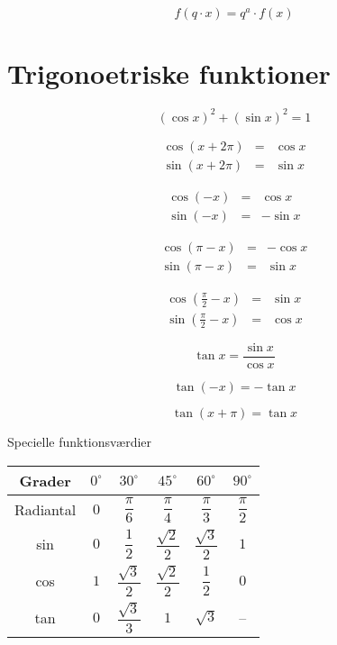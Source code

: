 \documentclass[11pt,a4paper,landscape,twocolumn,fleqn,leqno]{article}
\begin{document}
\begin{equation}
f(q \cdot x) = q^a \cdot f(x)
\end{equation}

\vfill

\section{Trigonoetriske funktioner}

\begin{equation}
(\cos x)^2 + (\sin x)^2 = 1
\end{equation}

\begin{eqnarray}
\cos(x + 2\pi) & = & \cos x \\
\sin(x + 2\pi) & = & \sin x \nonumber
\end{eqnarray}

\begin{eqnarray}
\cos(-x) & = & \cos x \\
\sin(-x) & = & - \sin x \nonumber
\end{eqnarray}

\begin{eqnarray}
\cos(\pi - x) & = & - \cos x \\
\sin(\pi - x) & = & \sin x \nonumber
\end{eqnarray}

\begin{eqnarray}
\cos\left(\frac{\pi}{2}-x\right) & = & \sin x \\
\sin\left(\frac{\pi}{2}-x\right) & = & \cos x \nonumber
\end{eqnarray}

\begin{equation}
\tan x = \frac{\sin x}{\cos x}
\end{equation}

\begin{equation}
\tan(-x) = -\tan x
\end{equation}

\begin{equation}
\tan(x+\pi) = \tan x
\end{equation}

Specielle funktionsværdier

\begin{tabular}{c|c c c c c}
\hline
Grader       & $0^{\circ}$ & $30^{\circ}$ & $45^{\circ}$ & $60^{\circ}$ & $90^{\circ}$ \\
\hline
Radiantal    & $0$ & $\dfrac{\pi}{6}$ & $\dfrac{\pi}{4}$ & $\dfrac{\pi}{3}$ & $\dfrac{\pi}{2}$ \\
\hline
sin          & $0$ & $\dfrac{1}{2}$ & $\dfrac{\sqrt{2}}{2}$ & $\dfrac{\sqrt{3}}{2}$ & $1$ \\
\hline
cos          & $1$ & $\dfrac{\sqrt{3}}{2}$ & $\dfrac{\sqrt{2}}{2}$ & $\dfrac{1}{2}$ & $0$ \\
\hline
tan          & $0$ & $\dfrac{\sqrt{3}}{3}$ & $1$ & $\sqrt{3}$ & -- \\
\hline
\end{tabular}
\end{document}
